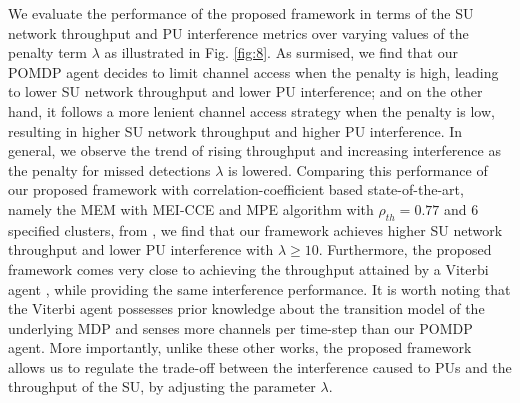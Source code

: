 \documentclass[10pt,twocolumn]{IEEEtran}
\begin{document}
We evaluate the performance of the proposed framework in terms of the SU network throughput and PU interference metrics over varying values of the penalty term $\lambda$ as illustrated in Fig. \ref{fig:8}. As surmised, we find that our POMDP agent decides to limit channel access when the penalty is high, leading to lower SU network throughput and lower PU interference; and on the other hand, it follows a more lenient channel access strategy when the penalty is low, resulting in higher SU network throughput and higher PU interference. In general, we observe the trend of rising throughput and increasing interference as the penalty for missed detections $\lambda$ is lowered. Comparing this performance of our proposed framework with correlation-coefficient based state-of-the-art, namely the MEM with MEI-CCE and MPE algorithm with $\rho_{th}{=}0.77$ and $6$ specified clusters, from \cite{6956794}, we find that our framework achieves higher SU network throughput and lower PU interference with $\lambda{\geq}10$. Furthermore, the proposed framework comes very close to achieving the throughput attained by a Viterbi agent \cite{4554696}, while providing the same interference performance. It is worth noting that the Viterbi agent possesses prior knowledge about the transition model of the underlying MDP and senses more channels per time-step than our POMDP agent. More importantly, unlike these other works, the proposed framework allows us to regulate the trade-off between the interference caused to PUs and the throughput of the SU, by adjusting the parameter $\lambda$.
\vspace{-4mm}
\end{document}
